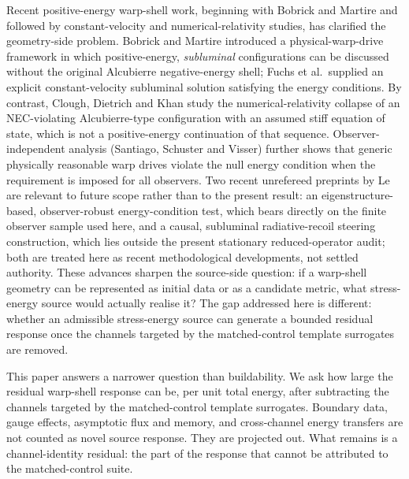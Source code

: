\documentclass[11pt,a4paper]{article}
\begin{document}
Recent positive-energy warp-shell work, beginning with Bobrick and Martire and followed by constant-velocity and numerical-relativity studies, has clarified the geometry-side problem. Bobrick and Martire introduced a physical-warp-drive framework in which positive-energy, \emph{subluminal} configurations can be discussed without the original Alcubierre negative-energy shell; Fuchs et al.\ supplied an explicit constant-velocity subluminal solution satisfying the energy conditions. By contrast, Clough, Dietrich and Khan study the numerical-relativity collapse of an NEC-violating Alcubierre-type configuration with an assumed stiff equation of state, which is not a positive-energy continuation of that sequence. Observer-independent analysis (Santiago, Schuster and Visser) further shows that generic physically reasonable warp drives violate the null energy condition when the requirement is imposed for all observers. Two recent unrefereed preprints by Le are relevant to future scope rather than to the present result: an eigenstructure-based, observer-robust energy-condition test, which bears directly on the finite observer sample used here, and a causal, subluminal radiative-recoil steering construction, which lies outside the present stationary reduced-operator audit; both are treated here as recent methodological developments, not settled authority. These advances sharpen the source-side question: if a warp-shell geometry can be represented as initial data or as a candidate metric, what stress-energy source would actually realise it? The gap addressed here is different: whether an admissible stress-energy source can generate a bounded residual response once the channels targeted by the matched-control template surrogates are removed. \cite{BobrickMartire2021,Fuchs2024,CloughDietrichKhan2024,SantiagoSchusterVisser2022,Le2026ObserverRobust,Le2026Steering}

This paper answers a narrower question than buildability. We ask how large the residual warp-shell response can be, per unit total energy, after subtracting the channels targeted by the matched-control template surrogates. Boundary data, gauge effects, asymptotic flux and memory, and cross-channel energy transfers are not counted as novel source response. They are projected out. What remains is a channel-identity residual: the part of the response that cannot be attributed to the matched-control suite.
\end{document}
